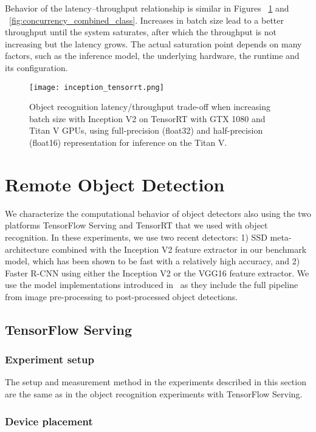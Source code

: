 \documentclass[sigconf]{acmart}
\begin{document}
Behavior of the latency--throughput relationship is similar in Figures ~\ref{fig:inception_tensorrt} and ~\ref{fig:concurrency_combined_class}. Increases in batch size lead to a better throughput until the system saturates, after which the throughput is not increasing but the latency grows. The actual saturation point depends on many factors, such as the inference model, the underlying hardware, the runtime and its configuration.

\begin{figure}[t]
\centering
\texttt{[image: inception\_tensorrt.png]}
\caption{Object recognition latency/throughput trade-off when increasing batch size with Inception V2 on TensorRT with GTX 1080 and Titan V GPUs, using full-precision (float32) and half-precision (float16) representation for inference on the Titan V.}
\label{fig:inception_tensorrt}
\end{figure}

\section{Remote Object Detection}\label{sec:detection}We characterize the computational behavior of object detectors also using the two platforms TensorFlow Serving and TensorRT that we used with object recognition.
In these experiments, we use two recent detectors: 1) SSD meta-architecture combined with the Inception V2 feature extractor in our benchmark model, which has been shown to be fast with a relatively high accuracy, and 2) Faster R-CNN using either the Inception V2 or the VGG16 feature extractor.
We use the model implementations introduced in~\cite{Huang2017CVPR} as they include the full pipeline from image pre-processing to post-processed object detections.

\subsection{TensorFlow Serving}\label{sec:TF_serving}\subsubsection{Experiment setup}

The setup and measurement method in the experiments described in this section are the same as in the object recognition experiments with TensorFlow Serving.

\subsubsection{Device placement}
\end{document}
